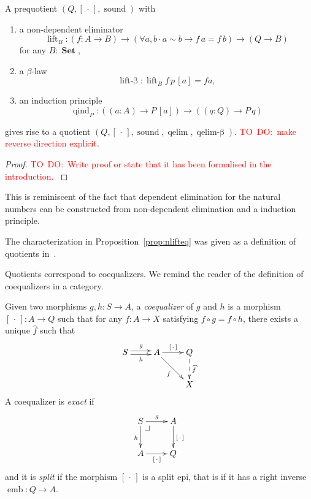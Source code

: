 \documentclass[envcountsame]{llncs}
\makeatletter
\newcommand{\todo}[1]{\textcolor{red}{TO~DO:~#1}}
\newcommand{\dotph}{\,\cdot\,} %
\providecommand{\class}[1]{[#1]}
\providecommand{\dlift}[1]{\widehat{#1}}
\DeclareMathOperator{\Set}{\mathbf{Set}}
\DeclareMathOperator{\sound}{sound}
\DeclareMathOperator{\qelimbeta}{qelim-\beta}
\DeclareMathOperator{\qind}{qind}
\DeclareMathOperator{\emb}{emb}
\DeclareMathOperator{\qelim}{qelim}
\DeclareMathOperator{\lift}{lift}
\DeclareMathOperator{\liftbeta}{lift-\beta}
\renewcommand{\equiv}{=}
\newcommand{\pullbackcorner}[1][dr]{\save*!/#1-1.2pc/#1:(-1,1)@^{|-}\restore}
\makeatother
\begin{document}
\begin{proposition}\label{prop:nlifteq}
A prequotient $(Q,\class\dotph,\sound)$ with

\begin{enumerate}
\item a non-dependent eliminator $$\lift_B\colon (f\colon A \to B) \to (\forall a,b\cdot a\sim b \to f\,a \equiv f\,b) \to (Q \to B)$$ for any $B\colon\Set$,
\item a $\beta$-law $$\liftbeta : \lift_B f \,p\,\class a\equiv f a,$$
\item an induction principle $$\qind_P\colon ((a\colon A)\to P \,\class a)\to ((q\colon Q)\to P\,q)$$
\end{enumerate}
gives rise to a quotient $(Q,\class\dotph,\sound,\qelim,\qelimbeta)$.
\todo{make reverse direction explicit}.
\end{proposition}
\begin{proof}
\todo{Write proof or state that it has been formalised in the introduction. }
\end{proof}
This is reminiscent of the fact that dependent elimination for the natural numbers can be constructed from non-dependent elimination and a induction principle.

The characterization in Proposition~\ref{prop:nlifteq} was given as a definition of quotients in~\cite{hofmann1995thesis}.


Quotients correspond to coequalizers. We remind the reader of the definition of coequalizers in a category.

\begin{definition}
Given two morphisms $g,h : S\to A$, a \emph{coequalizer} of $g$ and $h$ is a morphism $\class\dotph:A\to Q$ such that for any $f:A\to X$ satisfying $f \circ g = f \circ h$, there exists a unique $\dlift f$ such that
\[\xymatrix{
S\ar@<0.5ex>[r]^g\ar@<-0.5ex>[r]_h& A\ar[r]^{\class\dotph}\ar[dr]_{f} & Q\ar@{-->}[d]^{\dlift f}\\
&&X
}\]
A coequalizer is \emph{exact} if
\[\xymatrix{
S\pullbackcorner\ar[r]^g\ar[d]_h & A\ar[d]^{\class\dotph} \\
A\ar[r]_{\class\dotph} & Q
}\]
and it is \emph{split} if the morphism $\class\dotph$ is a split epi, that is if it has a right inverse $\emb : Q \to A$.
\end{definition}
\end{document}
